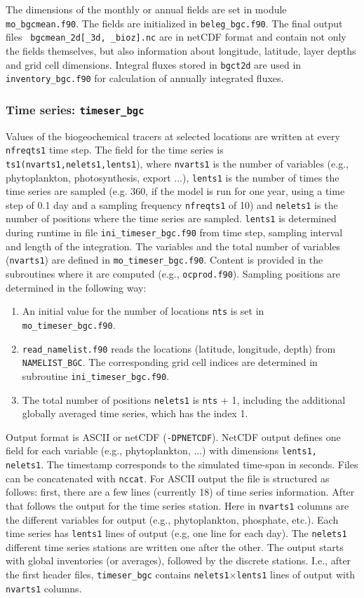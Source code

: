 \documentclass[11pt,a4paper,fleqn,twoside]{article}
\begin{document}
The dimensions of the monthly or annual fields are set in module {\tt mo\_bgcmean.f90}.
The fields are initialized in {\tt beleg\_bgc.f90}. The final output files {\tt
bgcmean\_2d[\_3d, \_bioz].nc} are in netCDF format and contain not only the fields themselves,
but also information about longitude, latitude, layer depths and grid cell
dimensions. Integral fluxes stored in {\tt bgct2d} are used in {\tt
inventory\_bgc.f90} for calculation of annually integrated fluxes.

\subsubsection{Time series: {\tt timeser\_bgc}} Values of the biogeochemical
tracers at selected locations are written at every {\tt nfreqts1} time step. The field for the
time series is {\tt ts1(nvarts1,nelets1,lents1}), where {\tt nvarts1} 
is the number of variables (e.g., phytoplankton,  photosynthesis,
export ...), {\tt lents1} is the number of times the time series are sampled
(e.g. 360, if the model is run for one year, using a time step of 0.1 day
and a sampling frequency {\tt nfreqts1} of 10) and {\tt nelets1} is the number
of positions where the time series are sampled.  {\tt lents1} is determined
during runtime in file {\tt ini\_timeser\_bgc.f90} from time step, sampling
interval and length of the integration. The variables and the total number of variables ({\tt nvarts1})
are defined in {\tt mo\_timeser\_bgc.f90}.  Content is provided  
in the subroutines where it are computed (e.g., {\tt ocprod.f90}).
Sampling positions are determined in the following way:  
\begin{enumerate} 
\item An initial value for the number of locations {\tt nts} is set in {\tt mo\_timeser\_bgc.f90}.
\item {\tt read\_namelist.f90} reads the locations (latitude, longitude, depth) from {\tt NAMELIST\_BGC}.
The corresponding grid cell indices are determined in subroutine {\tt ini\_timeser\_bgc.f90}.
\item The total number of positions {\tt nelets1} is {\tt nts} + 1, including 
the additional globally averaged time series, which has the index 1.
\end{enumerate}

Output format is ASCII or netCDF ({\tt -DPNETCDF}).
NetCDF output defines one field for each variable (e.g., phytoplankton, ...) 
with dimensions {\tt lents1, nelets1}. The timestamp corresponds to the simulated time-span in seconds.
Files can be concatenated with {\tt nccat}.
For ASCII output the file is structured as follows: first, there are
a few lines (currently 18) of time series information. After
that follows the output for the
time series station. Here in {\tt nvarts1} columns are the
different variables for output (e.g., phytoplankton, phosphate, etc.). Each
time series has {\tt lents1} lines of output (e.g, one line for each day).  The
{\tt nelets1} different time series stations are written one after the other.
The output starts with global inventories (or averages), followed by the
discrete stations. I.e., after the first header files, {\tt timeser\_bgc}
contains {\tt nelets1}$\times${\tt lents1} lines of output with {\tt nvarts1}
columns.
\end{document}
